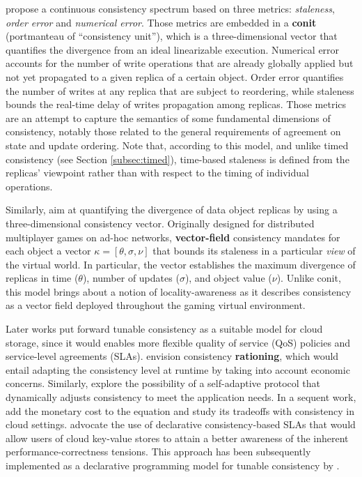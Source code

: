 \documentclass[letter, 11pt]{article}
\newcommand{\citeN}{\citet}
\begin{document}
\citeN{Yu.Vahdat:02} propose a continuous consistency spectrum 
based on three metrics: \emph{staleness}, \emph{order error} and \emph{numerical error}.
Those metrics are embedded in a \textbf{conit} (portmanteau of ``consistency unit''), 
which is a three-dimensional vector that quantifies the divergence from an ideal linearizable execution.
Numerical error accounts for the number of write operations that are already 
globally applied but not yet propagated to a given replica of a certain object.
Order error quantifies the number of writes 
at any replica that are subject to reordering, 
while staleness bounds the real-time delay of writes propagation among replicas.
Those metrics are an attempt to capture the semantics of some fundamental dimensions of consistency, 
notably those related to the general requirements of agreement on state and update ordering.
Note that, according to this model, and unlike timed consistency (see Section \ref{subsec:timed}), 
time-based staleness is defined from the replicas' viewpoint rather than 
with respect to the timing of individual operations.

Similarly, \citeN{Santos.Veiga.ea:07} aim at quantifying the 
divergence of data object replicas by using a three-dimensional consistency vector.
Originally designed for distributed multiplayer games on ad-hoc networks,
\textbf{vector-field} consistency mandates for each object a vector 
$\kappa = [\theta, \sigma, \nu ]$ that bounds its 
staleness in a particular \emph{view} of the virtual world.
In particular, the vector establishes the maximum divergence of replicas
in time ($\theta$), number of updates ($\sigma$), and object value ($\nu$).
Unlike conit, this model brings about a notion of locality-awareness as it describes
consistency as a vector field deployed throughout the gaming virtual environment.

Later works put forward tunable consistency as a suitable model for cloud storage,
since it would enables more flexible quality of service (QoS) policies and 
service-level agreements (SLAs). \citeN{Kraska.Hentschel.ea:09} envision consistency \textbf{rationing}, 
which would entail adapting the consistency level at runtime by taking into account economic concerns.
Similarly, \citeN{Chihoub.Ibrahim.ea:12} explore the possibility 
of a self-adaptive protocol that dynamically adjusts consistency to meet the application needs.
In a sequent work, \citeN{Chihoub.Ibrahim.ea:13} add the monetary cost to the equation 
and study its tradeoffs with consistency in cloud settings.
\citeN{Terry.Prabhakaran.ea:13} advocate the use of 
declarative consistency-based SLAs that would allow users of cloud key-value stores to attain
a better awareness of the inherent performance-correctness tensions.
This approach has been subsequently implemented as a declarative programming model 
for tunable consistency by \citeN{Sivaramakrishnan.ea:15}. 
\end{document}
